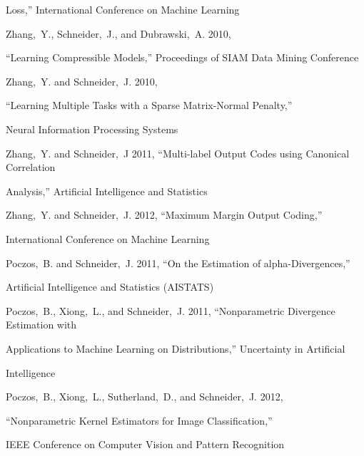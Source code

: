 \documentclass[prd,nofootbib,floatfix,11pt,tightenlines,nofootinbib]{revtex4}
\begin{document}
\begin{thebibliography}{99}
Loss,'' International Conference on Machine Learning




Zhang,~Y., Schneider,~J., and Dubrawski,~A. 2010,

``Learning Compressible Models,'' Proceedings of SIAM Data Mining Conference






Zhang,~Y. and Schneider,~J. 2010,

``Learning Multiple Tasks with a Sparse Matrix-Normal Penalty,''

Neural Information Processing Systems






Zhang,~Y. and Schneider,~J 2011, ``Multi-label Output Codes using Canonical Correlation

Analysis,'' Artificial Intelligence and Statistics




Zhang,~Y. and Schneider,~J. 2012, ``Maximum Margin Output Coding,''

International Conference on Machine Learning




Poczos,~B. and Schneider,~J. 2011, ``On the Estimation of alpha-Divergences,''

Artificial Intelligence and Statistics (AISTATS)




Poczos,~B., Xiong,~L., and Schneider,~J. 2011, ``Nonparametric Divergence Estimation with

Applications to Machine Learning on Distributions,''  Uncertainty in Artificial

Intelligence




Poczos,~B., Xiong,~L., Sutherland,~D., and Schneider,~J. 2012,

``Nonparametric Kernel Estimators for Image Classification,''

IEEE Conference on Computer Vision and Pattern Recognition




\end{thebibliography}
\end{document}

